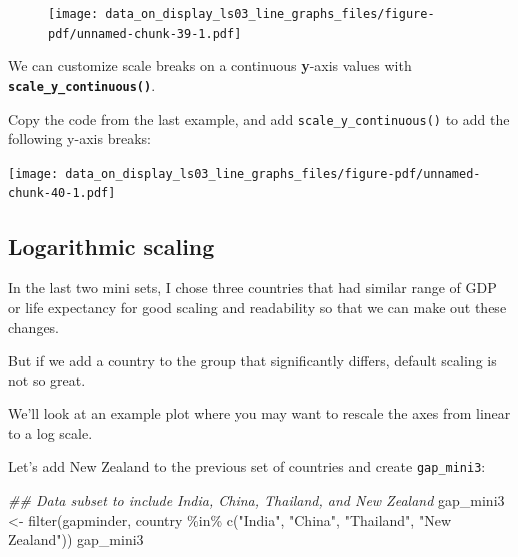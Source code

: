 \documentclass[
  letterpaper,
  DIV=11,
  numbers=noendperiod]{scrreprt}
\newenvironment{Shaded}{\begin{snugshade}}{\end{snugshade}}
\newcommand{\DocumentationTok}[1]{\textcolor[rgb]{0.37,0.37,0.37}{\textit{#1}}}
\newcommand{\FunctionTok}[1]{\textcolor[rgb]{0.28,0.35,0.67}{#1}}
\newcommand{\NormalTok}[1]{\textcolor[rgb]{0.00,0.23,0.31}{#1}}
\newcommand{\OtherTok}[1]{\textcolor[rgb]{0.00,0.23,0.31}{#1}}
\newcommand{\SpecialCharTok}[1]{\textcolor[rgb]{0.37,0.37,0.37}{#1}}
\newcommand{\StringTok}[1]{\textcolor[rgb]{0.13,0.47,0.30}{#1}}
\begin{document}
\begin{figure}[H]

{\centering \texttt{[image: data\_on\_display\_ls03\_line\_graphs\_files/figure-pdf/unnamed-chunk-39-1.pdf]}

}

\end{figure}

\begin{tcolorbox}[enhanced jigsaw, colframe=quarto-callout-tip-color-frame, colbacktitle=quarto-callout-tip-color!10!white, titlerule=0mm, opacitybacktitle=0.6, breakable, toprule=.15mm, arc=.35mm, rightrule=.15mm, colback=white, bottomrule=.15mm, opacityback=0, toptitle=1mm, left=2mm, bottomtitle=1mm, title=\textcolor{quarto-callout-tip-color}{\faLightbulb}\hspace{0.5em}{Practice}, leftrule=.75mm, coltitle=black]

We can customize scale breaks on a continuous \textbf{y}-axis values
with \textbf{\texttt{scale\_y\_continuous()}}.

Copy the code from the last example, and add
\texttt{scale\_y\_continuous()} to add the following y-axis breaks:

\texttt{[image: data\_on\_display\_ls03\_line\_graphs\_files/figure-pdf/unnamed-chunk-40-1.pdf]}

\end{tcolorbox}

\hypertarget{logarithmic-scaling}{%
\subsection{Logarithmic scaling}\label{logarithmic-scaling}}

In the last two mini sets, I chose three countries that had similar
range of GDP or life expectancy for good scaling and readability so that
we can make out these changes.

But if we add a country to the group that significantly differs, default
scaling is not so great.

We'll look at an example plot where you may want to rescale the axes
from linear to a log scale.

Let's add New Zealand to the previous set of countries and create
\texttt{gap\_mini3}:

\begin{Shaded}
\begin{Highlighting}[]
\DocumentationTok{\#\# Data subset to include India, China, Thailand, and New Zealand}
\NormalTok{gap\_mini3 }\OtherTok{\textless{}{-}} \FunctionTok{filter}\NormalTok{(gapminder,}
\NormalTok{                    country }\SpecialCharTok{\%in\%} \FunctionTok{c}\NormalTok{(}\StringTok{"India"}\NormalTok{,}
                                   \StringTok{"China"}\NormalTok{,}
                                   \StringTok{"Thailand"}\NormalTok{,}
                                   \StringTok{"New Zealand"}\NormalTok{))}
\NormalTok{gap\_mini3}
\end{Highlighting}
\end{Shaded}
\end{document}
